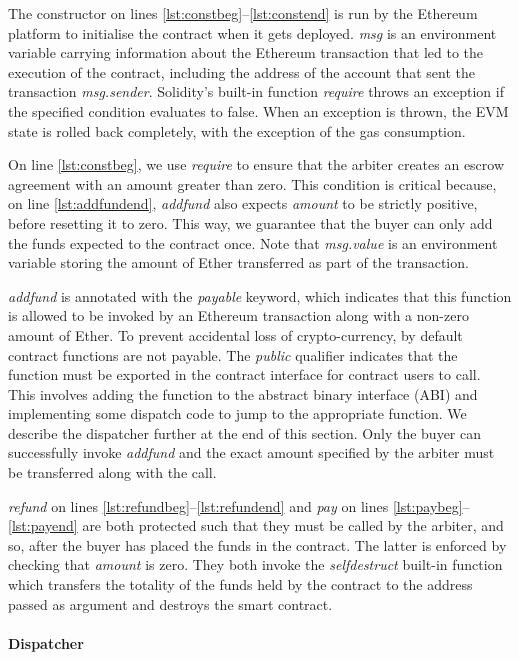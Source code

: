 \documentclass[sigplan,10pt]{acmart}\settopmatter{printfolios=true,printccs=false,printacmref=false}
\begin{document}
The constructor on lines \autoref{lst:constbeg}--\autoref{lst:constend}
is run by the Ethereum platform to initialise the contract when it gets deployed.
\textit{msg} is an environment variable carrying information
about the Ethereum transaction that led to the execution 
of the contract, including the address of the account that
sent the transaction \textit{msg.sender}.
Solidity's built-in function \textit{require} throws an exception
if the specified condition evaluates to false.
When an exception is thrown, the EVM state is rolled back completely,
with the exception of the gas consumption.

On line \ref{lst:constbeg}, we use \textit{require} to ensure that the arbiter creates
an escrow agreement with an amount greater than zero.
This condition is critical because, on line \autoref{lst:addfundend},
\textit{addfund} also expects \textit{amount} to be strictly positive,
before resetting it to zero.
This way, we guarantee that the buyer can only add the
funds expected to the contract once.
Note that \textit{msg.value} is an environment variable
storing the amount of Ether transferred as part of the transaction.

\textit{addfund} is annotated with the \textit{payable} keyword,
which indicates that this function is allowed to be invoked
by an Ethereum transaction along with a non-zero amount of
Ether.
To prevent accidental loss of crypto-currency, by default
contract functions are not payable.
The \textit{public} qualifier indicates that
the function must be exported in the contract interface
for contract users to call.
This involves adding the function to the abstract binary
interface (ABI) and implementing some dispatch code to jump
to the appropriate function.
We describe the dispatcher further at the end of this section.
Only the buyer can successfully invoke \textit{addfund} and
the exact amount specified by the arbiter must be transferred
along with the call.

\textit{refund} on lines \autoref{lst:refundbeg}--\autoref{lst:refundend}
and \textit{pay} on lines \autoref{lst:paybeg}--\autoref{lst:payend}
are both protected such that they must be called by the arbiter,
and so, after the buyer has placed the funds in the contract.
The latter is enforced by checking that \textit{amount} is zero.
They both invoke the \textit{selfdestruct} built-in function
which transfers the totality of the funds held by the contract
to the address passed as argument and destroys the smart
contract.


\paragraph{Dispatcher}
\end{document}

